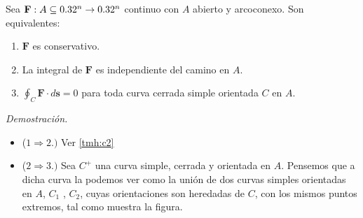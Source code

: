 \begin{theorem}
   Sea  $\mathbf{F}:A\subseteq0.32^n \to 0.32^n$ continuo con  $A$ abierto y arcoconexo.  Son equivalentes:
    \begin{enumerate}
        \item $\mathbf{F}$ es conservativo. 
        \item La integral de $\mathbf{F}$ es independiente del camino en $A$. 
        \item $\oint_C\mathbf{F}\cdot d\mathbf{s}=0$ para toda curva cerrada simple orientada $C$ en $A$.
    \end{enumerate}

    \textit{Demostración.} 
    \begin{itemize}
\item[] ($1 \Rightarrow 2.)$  Ver \ref{tmh:c2}
\item[] ($2 \Rightarrow 3.)$ Sea $C^{+}$ una curva simple, cerrada y orientada en $A$. Pensemos que a dicha curva la podemos ver como la uni\'on de  dos curvas   simples orientadas en $A$,  $C_1$ , $C_2$,  cuyas orientaciones son heredadas de $C$,   con los mismos puntos extremos,  tal como muestra la figura. 
    \begin{figure}[H]
        \begin{center}
\end{center}
\end{figure}
\end{itemize}
\end{theorem}
